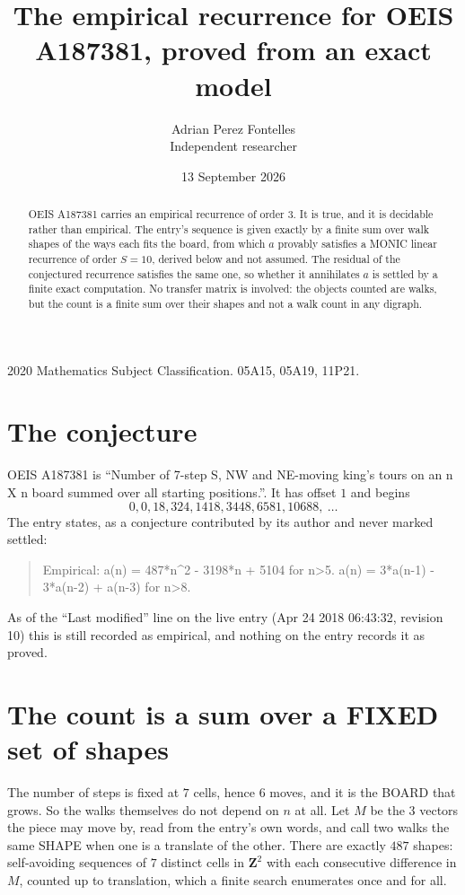 \documentclass[11pt,a4paper]{article}
\title{The empirical recurrence for OEIS A187381, proved from an exact model}
\author{Adrian Perez Fontelles\\ \small Independent researcher}
\date{13 September 2026}
\theoremstyle{plain}
\theoremstyle{definition}
\begin{document}
\maketitle

\begin{abstract}
OEIS A187381 carries an empirical recurrence of order $3$. It is true, and it is
decidable rather than empirical. The entry's sequence is given exactly by a finite sum over walk shapes of the ways each fits the board, from
which $a$ provably satisfies a MONIC linear recurrence of order $S=10$, derived below and not
assumed. The residual of the conjectured recurrence satisfies the same one, so whether it
annihilates $a$ is settled by a finite exact computation. No transfer matrix is involved: the objects counted are walks, but the count is a finite sum over their shapes and not a walk count in any digraph.
\end{abstract}

\noindent\small 2020 Mathematics Subject Classification. 05A15, 05A19, 11P21.\normalsize

\section{The conjecture}

OEIS A187381 is ``Number of 7-step S, NW and NE-moving king's tours on an n X n board summed over all starting positions.''. It has offset $1$ and begins
\[
0, 0, 18, 324, 1418, 3448, 6581, 10688,\ \dots
\]
The entry states, as a conjecture contributed by its author and never marked settled:
\begin{quote}
Empirical: a(n) = 487*n\^{}2 - 3198*n + 5104 for n>5. a(n) = 3*a(n-1) - 3*a(n-2) + a(n-3) for n>8.
\end{quote}
As of the ``Last modified'' line on the live entry (Apr 24 2018 06:43:32, revision 10)
this is still recorded as empirical, and nothing on the entry records it as proved.

\section{The count is a sum over a FIXED set of shapes}

The number of steps is fixed at $7$ cells, hence $6$ moves, and it is the BOARD
that grows. So the walks themselves do not depend on $n$ at all. Let $M$ be the $3$
vectors the piece may move by, read from the entry's own words, and call two walks the same
SHAPE when one is a translate of the other. There are exactly $487$ shapes: self-avoiding
sequences of $7$ distinct cells in $\mathbf{Z}^{2}$ with each consecutive difference in
$M$, counted up to translation, which a finite search enumerates once and for all.
\end{document}
